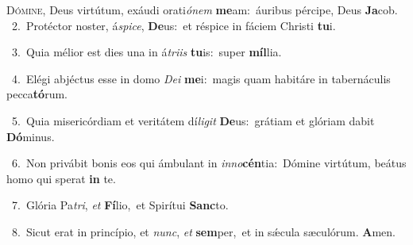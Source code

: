 \lettrine{\initial\textcolor{\initialcolor}{D}}{ómine,} Deus virtútum, exáudi orati\-\textit{ó}\-\textit{nem} \textbf{me}\-am:~\star áuribus pércipe, Deus \textbf{Ja}\-cob.\\
{\numbfont\textcolor{\numbcolor}{~2.}}~Protéctor noster, á\-\textit{spi}\-\textit{ce}, \textbf{De}\-us:~\star et réspice in fáciem Christi \textbf{tu}\-i.\par
{\numbfont\textcolor{\numbcolor}{~3.}}~Quia mélior est dies una in á\-\textit{tri}\-\textit{is} \textbf{tu}\-is:~\star super \textbf{míl}\-lia.\par
{\numbfont\textcolor{\numbcolor}{~4.}}~Elégi abjéctus esse in domo \textit{De}\-\textit{i} \textbf{me}\-i:~\star magis quam habitáre in tabernáculis pecca\-\textbf{tó}\-rum.\par
{\numbfont\textcolor{\numbcolor}{~5.}}~Quia misericórdiam et veritátem dí\-\textit{li}\-\textit{git} \textbf{De}\-us:~\star grátiam et glóriam dabit \textbf{Dó}\-minus.\par
{\numbfont\textcolor{\numbcolor}{~6.}}~Non privábit bonis eos qui ámbulant in \textit{in}\-\textit{no}\textbf{cén}tia:~\star Dómine virtútum, beátus homo qui sperat \textbf{in} te.\par
{\numbfont\textcolor{\numbcolor}{~7.}}~Glória Pa\-\textit{tri}\-, \textit{et} \textbf{Fí}\-lio,~\star et Spirítui \textbf{Sanc}\-to.\par
{\numbfont\textcolor{\numbcolor}{~8.}}~Sicut erat in princípio, et \textit{nunc}\-, \textit{et} \textbf{sem}\-per,~\star et in sǽcula sæculórum. \textbf{A}\-men.\par
